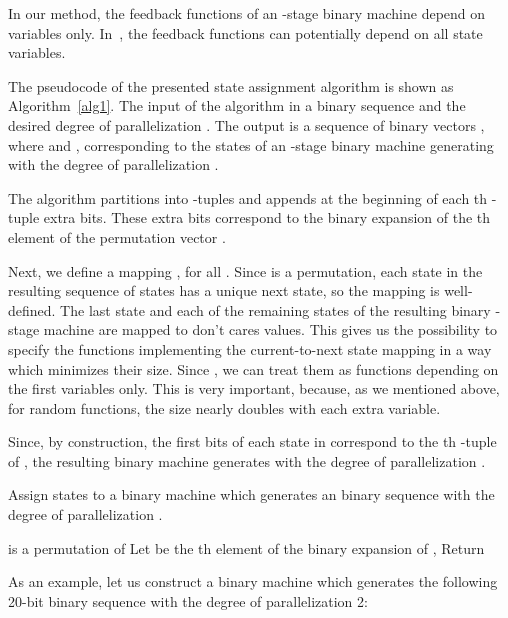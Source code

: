 \documentclass[10pt,conference]{IEEEtran}
\begin{document}
In our method, the feedback functions of an -stage binary
machine depend on 
variables only.
In~\cite{Du11a}, the feedback functions can potentially
depend on all state variables.

The pseudocode of the presented state assignment algorithm is shown as Algorithm~\ref{alg1}. The input of the algorithm in a binary sequence 
and the desired degree of parallelization .
The output is a sequence  of binary vectors 
, where  and , corresponding to the states of an -stage binary machine generating  with the degree of parallelization .

The algorithm partitions  into -tuples and appends at the beginning of each th
-tuple  extra bits. These extra bits correspond to the binary expansion 
of the th element of the permutation vector . 

Next, we define a mapping , for all . Since  is a permutation, each state 
in the resulting sequence of states has a unique next state,
so the mapping is well-defined. 
The last state  and each of the  
remaining states of the resulting binary -stage machine 
are mapped to don't cares values. This 
gives us the possibility to specify the functions 
implementing the current-to-next state mapping in a way which 
minimizes their size.
Since , we can treat them as functions depending
on the first  variables only.
This is very important, because, as we mentioned above, 
for random functions, the size 
nearly doubles with each extra variable.

Since, by construction, the first  bits of each state 
in  correspond to the th
-tuple of , the resulting binary machine generates  
with the degree of parallelization .


\begin{algorithm}[t!]
\caption{Assign states to a binary machine
which generates an binary sequence  
with the degree of parallelization .}
\label{alg1}
\begin{algorithmic}[1]
{\small
\STATE 
\STATE 
\STATE  is a permutation of 
\STATE Let  be the th element of the binary expansion of , 
\STATE   
\ENDFOR
{}
\STATE   
\ENDFOR
\STATE 
\ENDFOR
\STATE Return 
}
\end{algorithmic}
\end{algorithm}

As an example, let us construct a binary machine 
which generates the following 20-bit binary sequence with the degree of parallelization 2:
\end{document}
